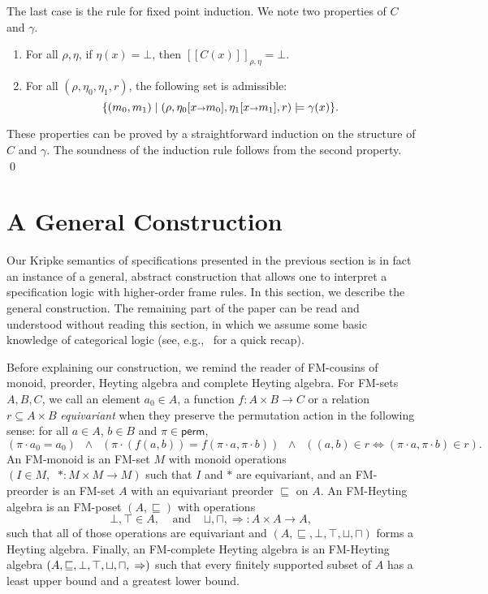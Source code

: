 \documentclass{LMCS}
\newcommand{\perm}{\mathsf{perm}}
\newcommand{\bind}{{\scriptstyle\relax\rightarrow}}
\newcommand{\ff}[1]{[\![#1]\!]}
\begin{document}
The last case is the rule for fixed point induction. We note
two properties of $C$ and $\gamma$.
\begin{enumerate}
\item For all $\rho,\eta$, if $\eta(x) = \bot$, then
    $\ff{C(x)}_{\rho,\eta} = \bot$.
\item For all $(\rho,\eta_0,\eta_1,r)$, the following set is admissible:
$$
  \{(m_0,m_1) \mid (\rho,\eta_0[x\bind m_0],\eta_1[x\bind m_1],r) \models \gamma(x)\}.
$$
\end{enumerate}
These properties can be proved by a straightforward induction on the
structure of $C$ and $\gamma$. The soundness of the induction rule 
follows from the second property.
\qed


\section{A General Construction}
\label{sec:general-construction}
Our Kripke semantics of specifications presented in the previous section is
in fact an instance of a general, abstract construction that allows one to
interpret a specification logic with
higher-order frame rules. In this section, we describe the general
construction. The remaining part of the paper can be read and understood
without reading this section, in which we assume some basic knowledge
of categorical logic (see, e.g.,~\cite{biering-birkedal-torpsmith-esop05}
for a quick recap).

Before explaining our construction, we remind the reader of FM-cousins of
monoid, preorder, Heyting algebra and complete Heyting algebra. For FM-sets
$A,B,C$, we call an element $a_0 \in A$, a function $f : A \times B
\rightarrow C$ or a relation $r \subseteq A\times B$ {\em equivariant\/}
when they preserve the permutation action in the following sense: for all
$a \in A$, $b\in B$ and $\pi \in \perm$,
$$
   (\pi \cdot a_0 = a_0)
   \;\;\wedge\;\;
   (\pi \cdot (f(a,b)) = f(\pi \cdot a, \pi \cdot b)) 
   \;\;\wedge\;\;
   ((a,b) \in r \iff (\pi \cdot a, \pi \cdot b) \in r).
$$
An FM-monoid is an FM-set $M$ with monoid operations
$(I \in M,\;\; *:M\times M \rightarrow M)$ such that
$I$ and $*$ are equivariant,
and an FM-preorder is an FM-set $A$ with an equivariant
preorder $\sqsubseteq$ on $A$. An FM-Heyting algebra
is an FM-poset $(A,\sqsubseteq)$ with operations
$$
   \bot,\top \in A,\;\;\;\;\mbox{and}\;\;\;\;
   \sqcup,\sqcap,\Rightarrow : A \times A \rightarrow A,
$$
such that all of those operations are equivariant and
$(A,\sqsubseteq,\bot,\top,\sqcup,\sqcap)$ forms a Heyting algebra.
Finally, an FM-complete Heyting algebra is
an FM-Heyting algebra
$(A,\sqsubseteq,\bot,\top,\sqcup,\sqcap,\\ \Rightarrow)$ such 
that every finitely supported subset of $A$ has a least
upper bound and a greatest lower bound.
\end{document}
